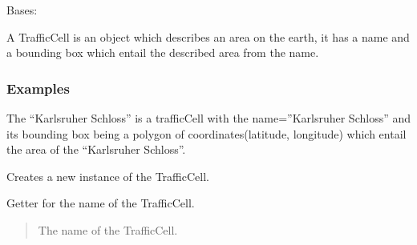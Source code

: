 \documentclass[letterpaper,10pt,english]{sphinxmanual}
\begin{document}
\begin{fulllineitems}
\label{\detokenize{apidoc/src.osm_configurator.model.project.calculation:src.osm_configurator.model.project.calculation.traffic_cell.TrafficCell}}
\pysigstartsignatures
{}
\pysigstopsignatures
\sphinxAtStartPar
Bases: 

\sphinxAtStartPar
A TrafficCell is an object which describes an area on the earth, it has a name and a bounding box which
entail the described area from the name.
\subsubsection*{Examples}

\sphinxAtStartPar
The “Karlsruher Schloss” is a trafficCell with the name=”Karlsruher Schloss” and its bounding box being
a polygon of coordinates(latitude, longitude) which entail the area of the “Karlsruher Schloss”.

\begin{fulllineitems}
\label{\detokenize{apidoc/src.osm_configurator.model.project.calculation:src.osm_configurator.model.project.calculation.traffic_cell.TrafficCell.__init__}}
\pysigstartsignatures
{}
\pysigstopsignatures
\sphinxAtStartPar
Creates a new instance of the TrafficCell.

\end{fulllineitems}


\begin{fulllineitems}
\label{\detokenize{apidoc/src.osm_configurator.model.project.calculation:src.osm_configurator.model.project.calculation.traffic_cell.TrafficCell.get_name}}
\pysigstartsignatures
{}
\pysigstopsignatures
\sphinxAtStartPar
Getter for the name of the TrafficCell.
\begin{quote}\begin{description}
\sphinxAtStartPar
The name of the TrafficCell.


\end{description}
\end{quote}
\end{fulllineitems}
\end{fulllineitems}
\end{document}
